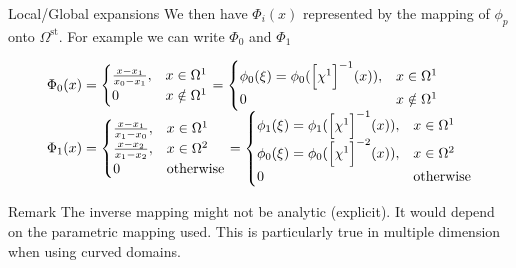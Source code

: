 \begin{frame}{Local/Global expansions}
  We then have $\Phi_i(x)$ represented by the mapping of $\phi_p$ onto $\Omega^{\text{st}}$. For example we can write $\Phi_0$ and $\Phi_1$

  \begin{equation}
    \label{eq:57}
    \begin{array}[c]{l}
      \Phi_0(x) =
    \begin{cases}
      \frac{x-x_1}{x_0-x_1}, & x \in \Omega^1\\
      0 & x \notin \Omega^1
    \end{cases}
    =
    \begin{cases}
      \phi_0(\xi) = \phi_0(\Big[ \chi^1\Big]^{-1} (x)), & x \in \Omega^1\\
      0 & x \notin \Omega^1
    \end{cases}\\
    \Phi_1(x) =
    \begin{cases}
      \frac{x-x_1}{x_1-x_0}, & x \in \Omega^1\\
      \frac{x-x_2}{x_1-x_2}, & x \in \Omega^2\\
      0 & \text{otherwise}
    \end{cases}
    =
    \begin{cases}
      \phi_1(\xi) = \phi_1(\Big[ \chi^1\Big]^{-1} (x)), & x \in \Omega^1\\
      \phi_0(\xi) = \phi_0(\Big[ \chi^1\Big]^{-2} (x)), & x \in \Omega^2\\
      0 & \text{otherwise}
    \end{cases}\\
    \end{array}
  \end{equation}

  \begin{block}{Remark}
    The inverse mapping might not be analytic (explicit). It would
    depend on the parametric mapping used. This is particularly true
    in multiple dimension when using curved domains.
  \end{block}


\end{frame}


